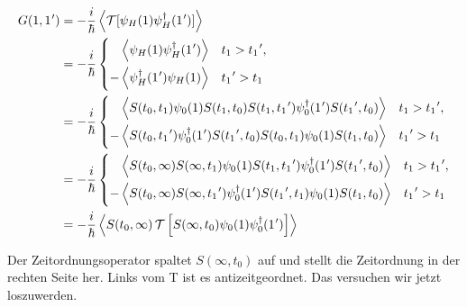 \begin{equation}
  \begin{aligned}
    G(1,1\mkern1mu')
     & = -\frac{i}{\hbar}\left\langle\mathcal T[\psi_H(1)\psi_H^\dagger(1\mkern1mu')]\right\rangle                                        \\
     & = -\frac{i}{\hbar}
    \left\{
    \begin{aligned}
      \left\langle\psi_H(1)\psi_H^\dagger(1\mkern1mu')\right\rangle  & \quad t_1>t_1\mkern1mu', \\
      -\left\langle\psi_H^\dagger(1\mkern1mu')\psi_H(1)\right\rangle & \quad t_1\mkern1mu'> t_1
    \end{aligned}
    \right.                                                                                                            \\
     & = -\frac{i}{\hbar}
    \left\{
    \begin{aligned}
      \left\langle S(t_0,t_1)\psi_0(1) S(t_1,t_0)S(t_1,t_1\mkern1mu') \psi_0^\dagger(1\mkern1mu') S(t_1\mkern1mu',t_0)\right\rangle  & \quad t_1>t_1\mkern1mu', \\
      -\left\langle S(t_0,t_1\mkern1mu')\psi_0^\dagger(1\mkern1mu') S(t_1\mkern1mu',t_0)S(t_0,t_1) \psi_0(1) S(t_1,t_0)\right\rangle & \quad t_1\mkern1mu'>t_1
    \end{aligned}
    \right.                                                                                                            \\
     & = -\frac{i}{\hbar}
    \left\{
    \begin{aligned}
      \left\langle S(t_0,\infty)S(\infty,t_1) \psi_0(1) S(t_1,t_1\mkern1mu') \psi_0^\dagger(1\mkern1mu') S(t_1\mkern1mu',t_0)\right\rangle  & \quad t_1>t_1\mkern1mu', \\
      -\left\langle S(t_0,\infty)S(\infty,t_1\mkern1mu') \psi_0^\dagger(1\mkern1mu') S(t_1\mkern1mu',t_1) \psi_0(1) S(t_1,t_0)\right\rangle & \quad t_1\mkern1mu'>t_1
    \end{aligned}
    \right.                                                                                                            \\
     & = -\frac{i}{\hbar}\left\langle S(t_0,\infty)\,\mathcal T\left[S(\infty,t_0)\psi_0(1)\psi_0^\dagger(1\mkern1mu')\right]\right\rangle
  \end{aligned}
\end{equation}

Der Zeitordnungsoperator spaltet $S(\infty,t_0)$ auf und stellt die Zeitordnung in der rechten Seite her. Links vom T
ist es antizeitgeordnet. Das versuchen wir jetzt loszuwerden.

\clearpage

\clearpage
